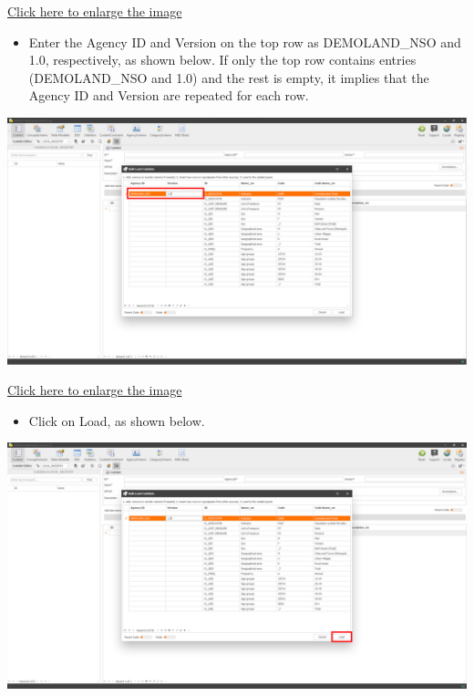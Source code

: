 \documentclass[
]{book}
\providecommand{\tightlist}{%
  \setlength{\itemsep}{0pt}\setlength{\parskip}{0pt}}
\begin{document}
\href{images/image090.png}{Click here to enlarge the image}

\begin{itemize}
\tightlist
\item
  Enter the Agency ID and Version on the top row as DEMOLAND\_NSO and 1.0, respectively, as shown below. If only the top row contains entries (DEMOLAND\_NSO and 1.0) and the rest is empty, it implies that the Agency ID and Version are repeated for each row.
\end{itemize}

\begin{center}\includegraphics[width=1\linewidth]{./images/image092} \end{center}

\href{images/image092.png}{Click here to enlarge the image}

\begin{itemize}
\tightlist
\item
  Click on Load, as shown below.
\end{itemize}

\begin{center}\includegraphics[width=1\linewidth]{./images/image094} \end{center}
\end{document}
